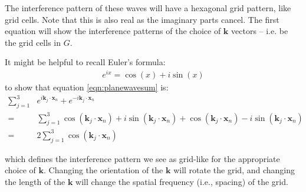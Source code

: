 \documentclass[10pt,letterpaper,oneside]{article}
\begin{document}
The interference pattern of these waves will have a hexagonal grid pattern, like grid cells. Note that this is also real as the imaginary parts cancel. The first equation will show the interference patterns of the choice of $\mathbf{k}$ vectors -- i.e. be the grid cells in $G$.

It might be helpful to recall Euler's formula: 
\begin{align}
   e^{i x} = \cos(x) + i \sin(x)
\end{align}
to show that equation \ref{eqn:planewavesum} is:
\begin{align}
  \sum_{j=1}^{3} & e^{i \mathbf{k}_j \cdot \mathbf{x}_n } + e^{-i \mathbf{k}_j \cdot \mathbf{x}_n } \\
  =&  \sum_{j=1}^{3} \cos(\mathbf{k}_j \cdot \mathbf{x}_n) + i \sin(\mathbf{k}_j \cdot \mathbf{x}_n) + \cos(\mathbf{k}_j \cdot \mathbf{x}_n) - i \sin(\mathbf{k}_j \cdot \mathbf{x}_n) \\
  =& 2 \sum_{j=1}^{3} \cos(\mathbf{k}_j \cdot \mathbf{x}_n)
\end{align}

which defines the interference pattern we see as grid-like for the appropriate choice of $\mathbf{k}$. Changing the orientation of the $\mathbf{k}$ will rotate the grid, and changing the length of the $\mathbf{k}$ will change the spatial frequency (i.e., spacing) of the grid.

\printbibliography
\end{document}
